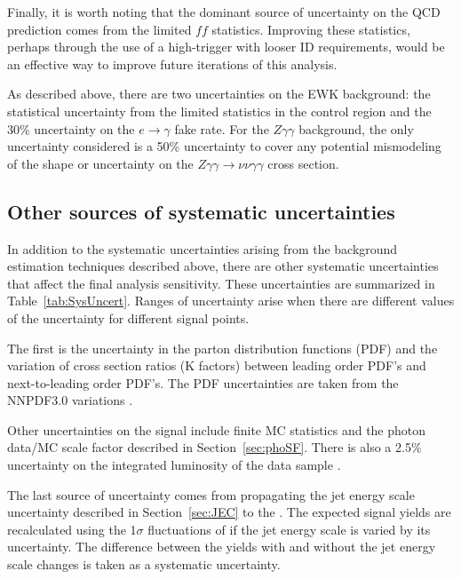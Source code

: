Finally, it is worth noting that the dominant source of uncertainty on the QCD prediction
comes from the limited $ff$ statistics. Improving these statistics, perhaps through 
the use of a high-\pT trigger with looser ID requirements, would be an effective
way to improve future iterations of this analysis.

As described above, there are two uncertainties on the EWK background: 
the statistical uncertainty from the limited statistics in the control region and 
the 30\% uncertainty on the $e\rightarrow\gamma$ fake rate. 
For the $Z\gamma\gamma$ background, the only uncertainty considered is 
a 50\% uncertainty to cover any potential mismodeling of the \ETmiss shape or 
uncertainty on the $Z\gamma\gamma\rightarrow\nu\nu\gamma\gamma$ cross section. 

\subsection{Other sources of systematic uncertainties}
\label{sec:otherSys}

In addition to the systematic uncertainties arising from the background estimation techniques
described above, there are other systematic uncertainties that affect the
final analysis sensitivity. These uncertainties are summarized in Table~\ref{tab:SysUncert}. 
Ranges of uncertainty arise when there are different values of the uncertainty
for different signal points.
 
The first is the uncertainty in the parton distribution functions (PDF) and the variation of 
cross section ratios (K factors) between leading order PDF's
and next-to-leading order PDF's. The PDF uncertainties are taken from the NNPDF3.0 variations \cite{Ball:2014uwa,Borschensky:2014cia}.

Other uncertainties on the signal include finite MC statistics and the photon data/MC scale
factor described in Section~\ref{sec:phoSF}. There is also a 2.5\% uncertainty on the integrated
luminosity of the data sample \cite{lumiPAS}. 

The last source of uncertainty comes from propagating the jet energy scale uncertainty described in Section~\ref{sec:JEC} to the \ETmiss. 
The expected signal yields are recalculated using the 1$\sigma$ fluctuations of \ETmiss if the jet energy scale is varied by its uncertainty. The difference between the yields with and without the jet energy scale changes is taken as a systematic uncertainty. 



